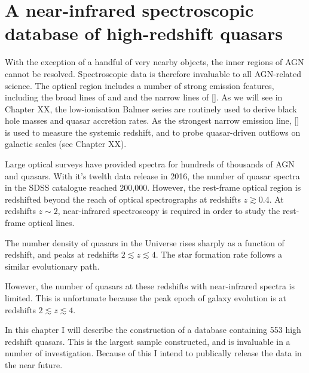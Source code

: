 
\chapter{A near-infrared spectroscopic database of high-redshift quasars}
\label{ch:chapter02}

With the exception of a handful of very nearby objects, the inner regions of AGN cannot be resolved. 
Spectroscopic data is therefore invaluable to all AGN-related science. 
The optical region includes a number of strong emission features, including the broad lines of \ha and \hb and the narrow lines of []. 
As we will see in Chapter XX, the low-ionisation Balmer series are routinely used to derive black hole masses and quasar accretion rates. 
As the strongest narrow emission line, [] is used to measure the systemic redshift, and to probe quasar-driven outflows on galactic scales (see Chapter XX). 

Large optical surveys have provided spectra for hundreds of thousands of AGN and quasars. 
With it's twelth data release in 2016, the number of quasar spectra in the SDSS catalogue reached 200,000. 
However, the rest-frame optical region is redshifted beyond the reach of optical spectrographs at redshifts $z \gtrsim$0.4. 
At redshifts $z\sim2$, near-infrared spectroscopy is required in order to study the rest-frame optical lines. 

The number density of quasars in the Universe rises sharply as a function of redshift, and peaks at redshifts $2\lesssim z \lesssim 4$. 
The star formation rate follows a similar evolutionary path. 





 
However, the number of quasars at these redshifts with near-infrared spectra is limited. 
This is unfortunate because the peak epoch of galaxy evolution is at redshifts $2\lesssim z \lesssim 4$. 

In this chapter I will describe the construction of a database containing 553 high redshift quasars. 
This is the largest sample constructed, and is invaluable in a number of investigation. 
Because of this I intend to publically release the data in the near future. 

